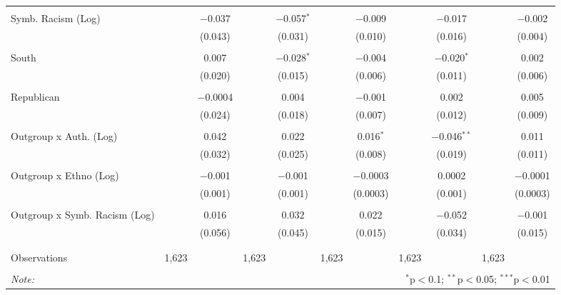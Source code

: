 \begin{table}[H]
{\begin{tabular}{@{\extracolsep{5pt}}lcccccccccc}
  & & & & & & & & & & \\ 
 Symb. Racism (Log) &  & $-$0.037 &  & $-$0.057$^{*}$ &  & $-$0.009 &  & $-$0.017 &  & $-$0.002 \\ 
  &  & (0.043) &  & (0.031) &  & (0.010) &  & (0.016) &  & (0.004) \\ 
  & & & & & & & & & & \\ 
 South &  & 0.007 &  & $-$0.028$^{*}$ &  & $-$0.004 &  & $-$0.020$^{*}$ &  & 0.002 \\ 
  &  & (0.020) &  & (0.015) &  & (0.006) &  & (0.011) &  & (0.006) \\ 
  & & & & & & & & & & \\ 
 Republican &  & $-$0.0004 &  & 0.004 &  & $-$0.001 &  & 0.002 &  & 0.005 \\ 
  &  & (0.024) &  & (0.018) &  & (0.007) &  & (0.012) &  & (0.009) \\ 
  & & & & & & & & & & \\ 
 Outgroup x Auth. (Log) &  & 0.042 &  & 0.022 &  & 0.016$^{*}$ &  & $-$0.046$^{**}$ &  & 0.011 \\ 
  &  & (0.032) &  & (0.025) &  & (0.008) &  & (0.019) &  & (0.011) \\ 
  & & & & & & & & & & \\ 
 Outgroup x Ethno (Log) &  & $-$0.001 &  & $-$0.001 &  & $-$0.0003 &  & 0.0002 &  & $-$0.0001 \\ 
  &  & (0.001) &  & (0.001) &  & (0.0003) &  & (0.001) &  & (0.0003) \\ 
  & & & & & & & & & & \\ 
 Outgroup x Symb. Racism (Log) &  & 0.016 &  & 0.032 &  & 0.022 &  & $-$0.052 &  & $-$0.001 \\ 
  &  & (0.056) &  & (0.045) &  & (0.015) &  & (0.034) &  & (0.015) \\ 
  & & & & & & & & & & \\ 
\hline \\[-1.8ex] 
Observations & 1,623 &  & 1,623 &  & 1,623 &  & 1,623 &  & 1,623 &  \\ 
\hline 
\hline \\[-1.8ex] 
\textit{Note:}  & \multicolumn{10}{r}{$^{*}$p$<$0.1; $^{**}$p$<$0.05; $^{***}$p$<$0.01} \\ 
\end{tabular}} 
\end{table} 
